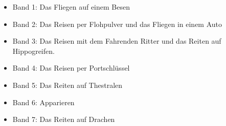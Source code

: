 \documentclass[a4paper, 10pt]{article}
\begin{document}
\begin{itemize}
\begin{itemize}
        \item Band 1: Das Fliegen auf einem Besen
        \item Band 2: Das Reisen per Flohpulver und das Fliegen in einem Auto
        \item Band 3: Das Reisen mit dem Fahrenden Ritter und das Reiten auf Hippogreifen.
        \item Band 4: Das Reisen per Portschlüssel
        \item Band 5: Das Reiten auf Thestralen
        \item Band 6: Apparieren
        \item Band 7: Das Reiten auf Drachen
    \end{itemize}
\end{itemize}
\end{document}
